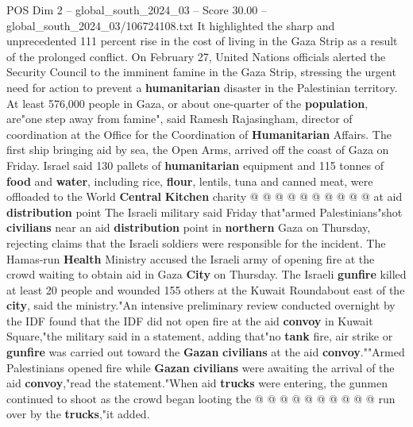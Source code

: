 \begin{textsample}{POS Dim 2 – global\_south\_2024\_03 – Score 30.00 – global\_south\_2024\_03/106724108.txt}
It highlighted the sharp and unprecedented 111 percent rise in the cost of living in the Gaza Strip as a result of the prolonged conflict.
On February 27, United Nations officials alerted the Security Council to the imminent famine in the Gaza Strip, stressing the urgent need for action to prevent a \textbf{humanitarian} disaster in the Palestinian territory.
At least 576,000 people in Gaza, or about one-quarter of the \textbf{population}, are"one step away from famine", said Ramesh Rajasingham, director of coordination at the Office for the Coordination of \textbf{Humanitarian} Affairs.
The first ship bringing aid by sea, the Open Arms, arrived off the coast of Gaza on Friday.
Israel said 130 pallets of \textbf{humanitarian} equipment and 115 tonnes of \textbf{food} and \textbf{water}, including rice, \textbf{flour}, lentils, tuna and canned meat, were offloaded to the World \textbf{Central} \textbf{Kitchen} charity @ @ @ @ @ @ @ @ @ @ at aid \textbf{distribution} point The Israeli military said Friday that"armed Palestinians"shot \textbf{civilians} near an aid \textbf{distribution} point in \textbf{northern} Gaza on Thursday, rejecting claims that the Israeli soldiers were responsible for the incident.
The Hamas-run \textbf{Health} Ministry accused the Israeli army of opening fire at the crowd waiting to obtain aid in Gaza \textbf{City} on Thursday.
The Israeli \textbf{gunfire} killed at least 20 people and wounded 155 others at the Kuwait Roundabout east of the \textbf{city}, said the ministry."An intensive preliminary review conducted overnight by the IDF found that the IDF did not open fire at the aid \textbf{convoy} in Kuwait Square,"the military said in a statement, adding that"no \textbf{tank} fire, air strike or \textbf{gunfire} was carried out toward the \textbf{Gazan} \textbf{civilians} at the aid \textbf{convoy}.""Armed Palestinians opened fire while \textbf{Gazan} \textbf{civilians} were awaiting the arrival of the aid \textbf{convoy},"read the statement."When aid \textbf{trucks} were entering, the gunmen continued to shoot as the crowd began looting the @ @ @ @ @ @ @ @ @ @ run over by the \textbf{trucks},"it added.

\end{textsample}
